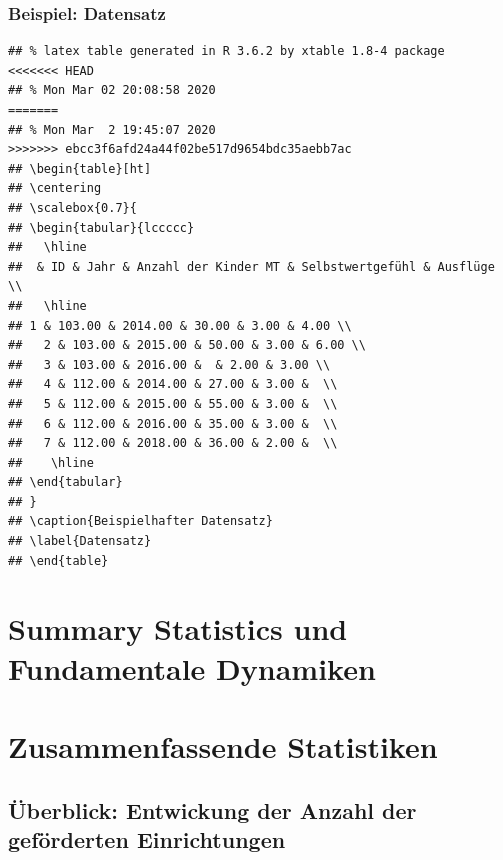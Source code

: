 \begin{frame}[fragile]
\frametitle{Beispiel: Datensatz}
\begin{knitrout}\footnotesize
{}\color{fgcolor}\begin{kframe}
\begin{verbatim}
## % latex table generated in R 3.6.2 by xtable 1.8-4 package
<<<<<<< HEAD
## % Mon Mar 02 20:08:58 2020
=======
## % Mon Mar  2 19:45:07 2020
>>>>>>> ebcc3f6afd24a44f02be517d9654bdc35aebb7ac
## \begin{table}[ht]
## \centering
## \scalebox{0.7}{
## \begin{tabular}{lccccc}
##   \hline
##  & ID & Jahr & Anzahl der Kinder MT & Selbstwertgefühl & Ausflüge \\ 
##   \hline
## 1 & 103.00 & 2014.00 & 30.00 & 3.00 & 4.00 \\ 
##   2 & 103.00 & 2015.00 & 50.00 & 3.00 & 6.00 \\ 
##   3 & 103.00 & 2016.00 &  & 2.00 & 3.00 \\ 
##   4 & 112.00 & 2014.00 & 27.00 & 3.00 &  \\ 
##   5 & 112.00 & 2015.00 & 55.00 & 3.00 &  \\ 
##   6 & 112.00 & 2016.00 & 35.00 & 3.00 &  \\ 
##   7 & 112.00 & 2018.00 & 36.00 & 2.00 &  \\ 
##    \hline
## \end{tabular}
## }
## \caption{Beispielhafter Datensatz} 
## \label{Datensatz}
## \end{table}
\end{verbatim}
\end{kframe}
\end{knitrout}
\end{frame}

\section{Summary Statistics und Fundamentale Dynamiken}


\section{Zusammenfassende Statistiken}

\subsection{Überblick: Entwickung der Anzahl der geförderten Einrichtungen}


